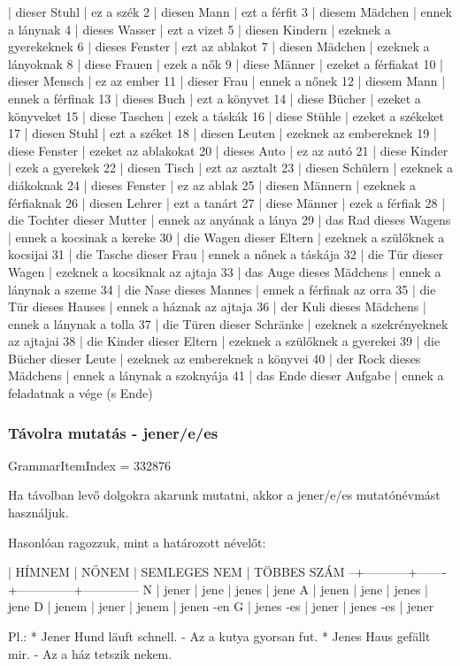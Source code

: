\documentclass{article}
\newenvironment{desc}{\verbatim}{\endverbatim}
\newenvironment{exmp}{\verbatim}{\endverbatim}
\begin{document}
\begin{exmp}
1 | dieser Stuhl | ez a szék
2 | diesen Mann | ezt a férfit
3 | diesem Mädchen | ennek a lánynak
4 | dieses Wasser | ezt a vizet
5 | diesen Kindern | ezeknek a gyerekeknek
6 | dieses Fenster | ezt az ablakot
7 | diesen Mädchen | ezeknek a lányoknak
8 | diese Frauen | ezek a nők
9 | diese Männer | ezeket a férfiakat
10 | dieser Mensch | ez az ember
11 | dieser Frau | ennek a nőnek
12 | diesem Mann | ennek a férfinak
13 | dieses Buch | ezt a könyvet
14 | diese Bücher | ezeket a könyveket
15 | diese Taschen | ezek a táskák
16 | diese Stühle | ezeket a székeket
17 | diesen Stuhl | ezt a széket
18 | diesen Leuten | ezeknek az embereknek
19 | diese Fenster | ezeket az ablakokat
20 | dieses Auto | ez az autó
21 | diese Kinder | ezek a gyerekek
22 | diesen Tisch | ezt az asztalt
23 | diesen Schülern | ezeknek a diákoknak
24 | dieses Fenster | ez az ablak
25 | diesen Männern | ezeknek a férfiaknak
26 | diesen Lehrer | ezt a tanárt
27 | diese Männer | ezek a férfiak
28 | die Tochter dieser Mutter | ennek az anyának a lánya
29 | das Rad dieses Wagens | ennek a kocsinak a kereke
30 | die Wagen dieser Eltern | ezeknek a szülőknek a kocsijai
31 | die Tasche dieser Frau | ennek a nőnek a táskája
32 | die Tür dieser Wagen | ezeknek a kocsiknak az ajtaja
33 | das Auge dieses Mädchens | ennek a lánynak a szeme
34 | die Nase dieses Mannes | ennek a férfinak az orra
35 | die Tür dieses Hauses | ennek a háznak az ajtaja
36 | der Kuli dieses Mädchens | ennek a lánynak a tolla
37 | die Türen dieser Schränke | ezeknek a szekrényeknek az ajtajai
38 | die Kinder dieser Eltern | ezeknek a szülőknek a gyerekei
39 | die Bücher dieser Leute | ezeknek az embereknek a könyvei
40 | der Rock dieses Mädchens | ennek a lánynak a szoknyája
41 | das Ende dieser Aufgabe | ennek a feladatnak a vége (s Ende)
\end{exmp}

\subsubsection{Távolra mutatás - jener/e/es}

GrammarItemIndex = 332876

\begin{desc}
Ha távolban levő dolgokra akarunk mutatni, akkor a jener/e/es mutatónévmást használjuk.

Hasonlóan ragozzuk, mint a határozott névelőt:

  | HÍMNEM    | NŐNEM | SEMLEGES NEM | TÖBBES SZÁM
--+-----------+-------+--------------+--------------
N | jener     | jene  | jenes        | jene
A | jenen     | jene  | jenes        | jene
D | jenem     | jener | jenem        | jenen -en
G | jenes -es | jener | jenes -es    | jener

Pl.: * Jener Hund läuft schnell. - Az a kutya gyorsan fut.
* Jenes Haus gefällt mir. - Az a ház tetszik nekem.
\end{desc}
\end{document}
